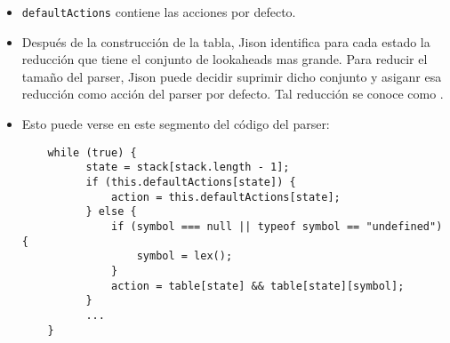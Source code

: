 \begin{itemize}
\item
\verb|defaultActions| contiene las acciones por defecto.

\item
Después de la construcción de la tabla, Jison identifica para
cada estado la reducción que tiene el conjunto 
de lookaheads mas grande. Para reducir el tamaño del parser,
Jison puede decidir suprimir dicho conjunto y asiganr esa reducción como 
acción del parser por defecto. Tal reducción se conoce como
.
\item Esto puede verse en este segmento del código del parser:
\begin{verbatim}
    while (true) {
          state = stack[stack.length - 1]; 
          if (this.defaultActions[state]) {
              action = this.defaultActions[state];
          } else {
              if (symbol === null || typeof symbol == "undefined") {
                  symbol = lex();
              }   
              action = table[state] && table[state][symbol];
          }   
          ...
    }
\end{verbatim}
\end{itemize}

